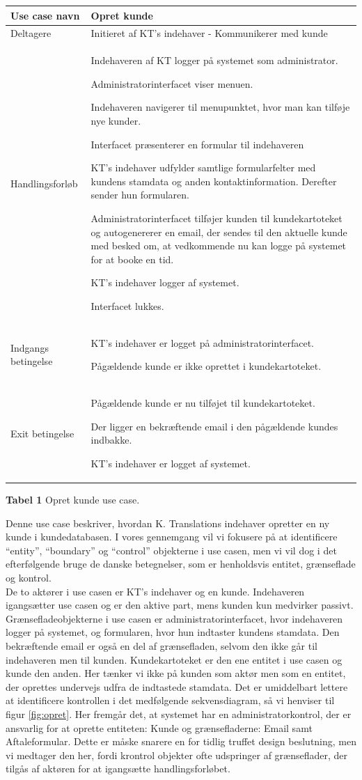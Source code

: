 \documentclass[12pt]{article}   %
\newcommand{\nextitem}{\par\hspace*{\labelsep}\textbullet\hspace*{\labelsep}}
\begin{document}
\begin{tabular}{l p{10cm}}
Use case navn & Opret kunde \\ \hline
Deltagere & \nextitem Initieret af KT's indehaver -
             Kommunikerer med kunde \\ \hline
Handlingsforløb &
	\nextitem Indehaveren af KT logger på systemet som administrator. 
	\nextitem Administratorinterfacet viser menuen.
	\nextitem Indehaveren navigerer til menupunktet, hvor man kan tilføje nye
		kunder.
		\nextitem Interfacet præsenterer en formular til indehaveren
	\nextitem KT's indehaver udfylder samtlige formularfelter med
		kundens stamdata og anden kontaktinformation. Derefter
		sender hun formularen.		
	\nextitem Administratorinterfacet tilføjer kunden til kundekartoteket
	og autogenererer en email, der sendes til den aktuelle kunde
		med besked om, at vedkommende nu kan logge på systemet for at
		booke en tid.
	\nextitem KT's indehaver logger af systemet. 
	\nextitem Interfacet lukkes.
	\\ \hline
	Indgangs betingelse &
		\nextitem KT's indehaver er logget på administratorinterfacet. 
		\nextitem Pågældende kunde er ikke oprettet i kundekartoteket. 
		\\ \hline
Exit betingelse & 
	\nextitem Pågældende kunde er nu tilføjet til
			kundekartoteket.
		\nextitem Der ligger en bekræftende email i den pågældende kundes
			indbakke.
		\nextitem KT's indehaver er logget af systemet.\\ \hline
\end{tabular}
\begin{center}
\textbf{Tabel 1} Opret kunde use case.
\end{center}
\vspace{0.5cm}

Denne use case beskriver, hvordan K. Translations indehaver opretter en ny kunde i kundedatabasen. I vores gennemgang vil vi fokusere på at identificere ``entity'', ``boundary'' og ``control'' objekterne i use casen, men vi vil dog i det efterfølgende bruge de danske betegnelser, som er henholdsvis entitet, grænseflade og kontrol. \\
De to aktører i use casen er KT's indehaver og en kunde. Indehaveren igangsætter use casen og er den aktive part, mens kunden kun medvirker passivt. Grænsefladeobjekterne i use casen er administratorinterfacet, hvor indehaveren
logger på systemet, og formularen, hvor hun indtaster kundens stamdata. Den bekræftende email er også en del af grænsefladen, selvom den ikke går til 
indehaveren men til kunden. Kundekartoteket er den ene entitet i use casen og kunde den anden. Her tænker vi ikke på kunden som aktør men som en entitet, der oprettes undervejs udfra de indtastede stamdata. Det er umiddelbart
lettere at identificere kontrollen i det medfølgende sekvensdiagram, så vi henviser til figur \ref{fig:opret}. Her fremgår det, at systemet har en administratorkontrol, der er ansvarlig for at oprette entiteten: Kunde og
grænsefladerne: Email samt Aftaleformular. Dette er måske snarere en for tidlig truffet design beslutning, men vi medtager den her, fordi krontrol objekter ofte udspringer af grænseflader, der tilgås af aktøren for at igangsætte 
handlingsforløbet.    
\end{document}
